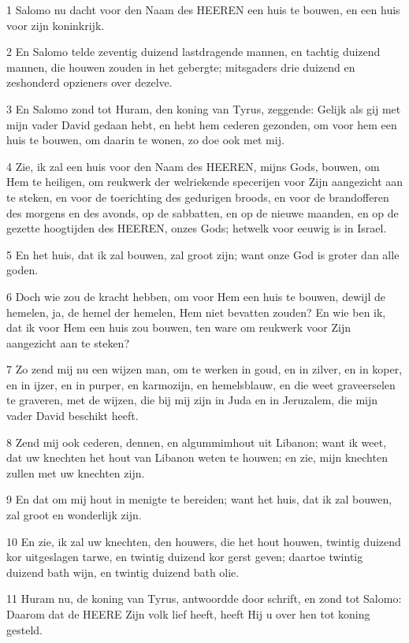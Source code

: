 \par 1 Salomo nu dacht voor den Naam des HEEREN een huis te bouwen, en een huis voor zijn koninkrijk.
\par 2 En Salomo telde zeventig duizend lastdragende mannen, en tachtig duizend mannen, die houwen zouden in het gebergte; mitsgaders drie duizend en zeshonderd opzieners over dezelve.
\par 3 En Salomo zond tot Huram, den koning van Tyrus, zeggende: Gelijk als gij met mijn vader David gedaan hebt, en hebt hem cederen gezonden, om voor hem een huis te bouwen, om daarin te wonen, zo doe ook met mij.
\par 4 Zie, ik zal een huis voor den Naam des HEEREN, mijns Gods, bouwen, om Hem te heiligen, om reukwerk der welriekende specerijen voor Zijn aangezicht aan te steken, en voor de toerichting des gedurigen broods, en voor de brandofferen des morgens en des avonds, op de sabbatten, en op de nieuwe maanden, en op de gezette hoogtijden des HEEREN, onzes Gods; hetwelk voor eeuwig is in Israel.
\par 5 En het huis, dat ik zal bouwen, zal groot zijn; want onze God is groter dan alle goden.
\par 6 Doch wie zou de kracht hebben, om voor Hem een huis te bouwen, dewijl de hemelen, ja, de hemel der hemelen, Hem niet bevatten zouden? En wie ben ik, dat ik voor Hem een huis zou bouwen, ten ware om reukwerk voor Zijn aangezicht aan te steken?
\par 7 Zo zend mij nu een wijzen man, om te werken in goud, en in zilver, en in koper, en in ijzer, en in purper, en karmozijn, en hemelsblauw, en die weet graveerselen te graveren, met de wijzen, die bij mij zijn in Juda en in Jeruzalem, die mijn vader David beschikt heeft.
\par 8 Zend mij ook cederen, dennen, en algummimhout uit Libanon; want ik weet, dat uw knechten het hout van Libanon weten te houwen; en zie, mijn knechten zullen met uw knechten zijn.
\par 9 En dat om mij hout in menigte te bereiden; want het huis, dat ik zal bouwen, zal groot en wonderlijk zijn.
\par 10 En zie, ik zal uw knechten, den houwers, die het hout houwen, twintig duizend kor uitgeslagen tarwe, en twintig duizend kor gerst geven; daartoe twintig duizend bath wijn, en twintig duizend bath olie.
\par 11 Huram nu, de koning van Tyrus, antwoordde door schrift, en zond tot Salomo: Daarom dat de HEERE Zijn volk lief heeft, heeft Hij u over hen tot koning gesteld.
